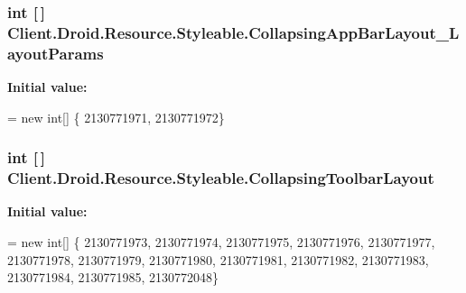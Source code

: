 \subsubsection[{Collapsing\+App\+Bar\+Layout\+\_\+\+Layout\+Params}]{\setlength{\rightskip}{0pt plus 5cm}int \mbox{[}$\,$\mbox{]} Client.\+Droid.\+Resource.\+Styleable.\+Collapsing\+App\+Bar\+Layout\+\_\+\+Layout\+Params\hspace{0.3cm}{\ttfamily [static]}}\label{classClient_1_1Droid_1_1Resource_1_1Styleable_aecb05c92cdd5a5b5699ee2ba9df1aeee}
{\bfseries Initial value\+:}
\begin{DoxyCode}
= \textcolor{keyword}{new} \textcolor{keywordtype}{int}[]
            \{
                    2130771971,
                    2130771972\}
\end{DoxyCode}
\hypertarget{classClient_1_1Droid_1_1Resource_1_1Styleable_a8cd09a192454699f526297c5482eb29e}{}
\subsubsection[{Collapsing\+Toolbar\+Layout}]{\setlength{\rightskip}{0pt plus 5cm}int \mbox{[}$\,$\mbox{]} Client.\+Droid.\+Resource.\+Styleable.\+Collapsing\+Toolbar\+Layout\hspace{0.3cm}{\ttfamily [static]}}\label{classClient_1_1Droid_1_1Resource_1_1Styleable_a8cd09a192454699f526297c5482eb29e}
{\bfseries Initial value\+:}
\begin{DoxyCode}
= \textcolor{keyword}{new} \textcolor{keywordtype}{int}[]
            \{
                    2130771973,
                    2130771974,
                    2130771975,
                    2130771976,
                    2130771977,
                    2130771978,
                    2130771979,
                    2130771980,
                    2130771981,
                    2130771982,
                    2130771983,
                    2130771984,
                    2130771985,
                    2130772048\}
\end{DoxyCode}
\hypertarget{classClient_1_1Droid_1_1Resource_1_1Styleable_a7520d0723a03b2f549da9b8868063e2d}{}
